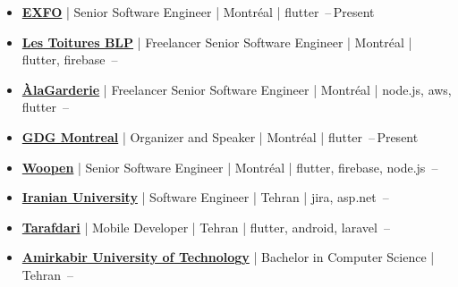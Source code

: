 \documentclass[letterpaper,11pt]{article}
\begin{document}


\begin{itemize}[leftmargin=*, noitemsep, topsep=0pt, partopsep=0pt]
      \item
            \href{https://exfo.com}
            {\textbf{EXFO}} | Senior Software Engineer | Montréal | flutter
            \hfill {}\,--\,Present

      \item    \BigGap

            \href{https://toituresblp.ca}
            {\textbf{Les Toitures BLP}} | Freelancer Senior Software Engineer | Montréal | flutter, firebase
            \hfill {}\,--\,

      \item    \BigGap
            \href{https://alagarderie.ca}
            {\textbf{ÀlaGarderie}} | Freelancer Senior Software Engineer | Montréal | node.js, aws, flutter
            \hfill {}\,--\,

      \item    \BigGap
            \href{https://gdg.community.dev/gdg-montreal}
            {\textbf{GDG Montreal}} | Organizer and Speaker | Montréal | flutter
            \hfill {}\,--\,Present

      \item    \BigGap
            \href{https://woopen.com}
            {\textbf{Woopen}} | Senior Software Engineer | Montréal | flutter, firebase, node.js
            \hfill {}\,--\,

      \item   \BigGap
            \href{https://en.iranian.ac.ir}
            {\textbf{Iranian University}} | Software Engineer | Tehran | jira, asp.net
            \hfill {}\,--\,

      \item   \BigGap
            \href{https://tarafdari.com}
            {\textbf{Tarafdari}} | Mobile Developer | Tehran | flutter, android, laravel
            \hfill {}\,--\,

      \item   \BigGap
            \href{https://aut.ac.ir/en}
            {\textbf{Amirkabir University of Technology}} | Bachelor in Computer Science | Tehran
            \hfill {}\,--\,
\end{itemize}
\end{document}
